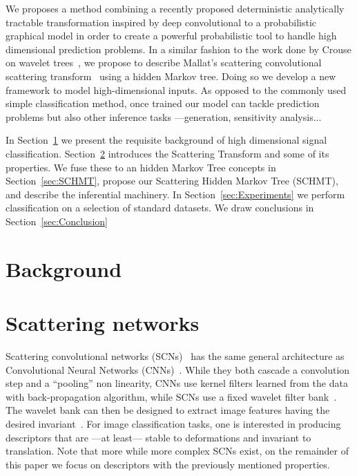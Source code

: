 \documentclass{article}
\begin{document}
  We proposes a method combining a recently proposed deterministic analytically tractable transformation inspired by deep convolutional to a probabilistic graphical model in order to create a powerful probabilistic tool to handle high dimensional prediction problems. In a similar fashion to the work done by Crouse on wavelet trees~\citep{crouse1998wavelet}, we propose to describe Mallat's scattering convolutional scattering transform~\citep{bruna2010classification} using a hidden Markov tree. Doing so we develop a new framework to model high-dimensional inputs. As opposed to the commonly used simple classification method, once trained our model can tackle prediction problems but also other inference tasks ---\eg generation, sensitivity analysis... %

  In  Section~\ref{sec:Background}  we  present  the  requisite  background  of high dimensional signal classification. Section~\ref{sec:SCN} introduces the Scattering Transform and some of its properties.   We  fuse these to an hidden Markov Tree concepts in Section~\ref{sec:SCHMT}, propose our Scattering Hidden Markov Tree (SCHMT), and describe the inferential machinery. In Section~\ref{sec:Experiments} we perform classification on a selection of standard datasets. We draw conclusions in Section~\ref{sec:Conclusion}
	
\section{Background}
  \label{sec:Background}


\section{Scattering networks}
  \label{sec:SCN}

  Scattering convolutional networks (SCNs)~\cite{bruna} has the same general architecture as Convolutional Neural Networks (CNNs)~\citet{lecun1995convolutional}. While they both cascade a convolution step and a ``pooling'' non linearity, CNNs use kernel filters learned from the data with back-propagation algorithm, while SCNs use a fixed wavelet filter bank~\cite{mallat}. The wavelet bank can then be designed to extract image features having the desired invariant~\cite{work translation invariant, work rotation invariant, work rigid motion}. For image classification tasks, one is interested in producing descriptors that are ---at least--- stable to deformations and invariant to translation. Note that more while more complex SCNs exist, on the remainder of this paper we focus on descriptors with the previously mentioned properties.
  
\end{document}
